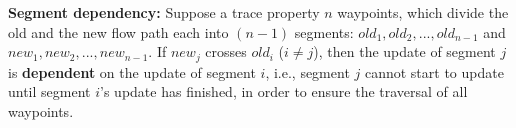 

  \vspace{-0.1in}
\begin{definition} 
{\bf Segment dependency:}
Suppose a trace property  $n$ waypoints, 
which divide the old and the new flow path each into $(n - 1)$ segments:
$old_1, old_2, ..., old_{n - 1}$ and $new_1, new_2, ..., new_{n - 1}$.
If $new_j$ crosses $old_i$ ($i \ne j$), then the update of segment $j$ is 
{\bf dependent} on the update of segment $i$, 
i.e., segment $j$ cannot start to update until segment $i$'s update has finished,
in order to ensure the traversal of all waypoints. 
\end{definition}
  \vspace{-0.1in}

